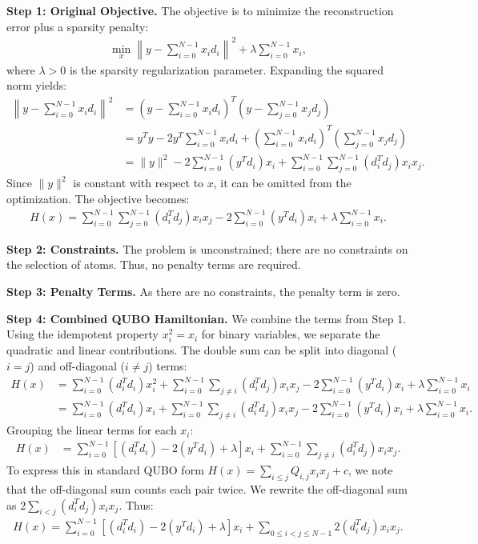 \documentclass[12pt]{article}
\begin{document}
\textbf{Step 1: Original Objective.}
The objective is to minimize the reconstruction error plus a sparsity penalty:
\begin{align}
    \min_{x} \left\| y - \sum_{i=0}^{N-1} x_i d_i \right\|^2 + \lambda \sum_{i=0}^{N-1} x_i,
\end{align}
where $\lambda > 0$ is the sparsity regularization parameter. Expanding the squared norm yields:
\begin{align}
    \left\| y - \sum_{i=0}^{N-1} x_i d_i \right\|^2 &= \left( y - \sum_{i=0}^{N-1} x_i d_i \right)^T \left( y - \sum_{j=0}^{N-1} x_j d_j \right) \\
    &= y^T y - 2 y^T \sum_{i=0}^{N-1} x_i d_i + \left( \sum_{i=0}^{N-1} x_i d_i \right)^T \left( \sum_{j=0}^{N-1} x_j d_j \right) \\
    &= \|y\|^2 - 2 \sum_{i=0}^{N-1} (y^T d_i) x_i + \sum_{i=0}^{N-1} \sum_{j=0}^{N-1} (d_i^T d_j) x_i x_j.
\end{align}
Since $\|y\|^2$ is constant with respect to $x$, it can be omitted from the optimization. The objective becomes:
\begin{align}
    H(x) = \sum_{i=0}^{N-1} \sum_{j=0}^{N-1} (d_i^T d_j) x_i x_j - 2 \sum_{i=0}^{N-1} (y^T d_i) x_i + \lambda \sum_{i=0}^{N-1} x_i.
\end{align}

\textbf{Step 2: Constraints.}
The problem is unconstrained; there are no constraints on the selection of atoms. Thus, no penalty terms are required.

\textbf{Step 3: Penalty Terms.}
As there are no constraints, the penalty term is zero.

\textbf{Step 4: Combined QUBO Hamiltonian.}
We combine the terms from Step 1. Using the idempotent property $x_i^2 = x_i$ for binary variables, we separate the quadratic and linear contributions. The double sum can be split into diagonal ($i=j$) and off-diagonal ($i \neq j$) terms:
\begin{align}
    H(x) &= \sum_{i=0}^{N-1} (d_i^T d_i) x_i^2 + \sum_{i=0}^{N-1} \sum_{j \neq i} (d_i^T d_j) x_i x_j - 2 \sum_{i=0}^{N-1} (y^T d_i) x_i + \lambda \sum_{i=0}^{N-1} x_i \\
    &= \sum_{i=0}^{N-1} (d_i^T d_i) x_i + \sum_{i=0}^{N-1} \sum_{j \neq i} (d_i^T d_j) x_i x_j - 2 \sum_{i=0}^{N-1} (y^T d_i) x_i + \lambda \sum_{i=0}^{N-1} x_i.
\end{align}
Grouping the linear terms for each $x_i$:
\begin{align}
    H(x) &= \sum_{i=0}^{N-1} \left[ (d_i^T d_i) - 2 (y^T d_i) + \lambda \right] x_i + \sum_{i=0}^{N-1} \sum_{j \neq i} (d_i^T d_j) x_i x_j.
\end{align}
To express this in standard QUBO form $H(x) = \sum_{i \leq j} Q_{i,j} x_i x_j + c$, we note that the off-diagonal sum counts each pair twice. We rewrite the off-diagonal sum as $2 \sum_{i < j} (d_i^T d_j) x_i x_j$. Thus:
\begin{align}
    H(x) = \sum_{i=0}^{N-1} \left[ (d_i^T d_i) - 2 (y^T d_i) + \lambda \right] x_i + \sum_{0 \leq i < j \leq N-1} 2 (d_i^T d_j) x_i x_j.
\end{align}
\end{document}
